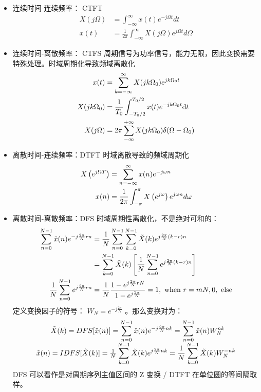 \documentclass[cn,11pt,chinese,black,simple]{elegantbook}
\begin{document}
\begin{itemize}
    \item 连续时间-连续频率： CTFT \[\begin{aligned}
        X(j \Omega) &=\int_{-\infty}^{\infty} x(t) e^{-j \Omega t} d t \\ 
        x(t) &=\frac{1}{2 \pi} \int_{-\infty}^{\infty} X(j \Omega) e^{j \Omega t} d \Omega
    \end{aligned}\]
    \item 连续时间-离散频率： CTFS 周期信号为功率信号，能力无限，因此变换需要特殊处理。时域周期化导致频域离散化 \[\begin{aligned}
        x(t) &= \displaystyle\sum_{k=-\infty}^{\infty} X(j k \Omega_0)     e^{jk\Omega_0 t} \\
        X(jk\Omega_0) &= \frac{1}{T_0} \int_{-T_0/2}^{T_0/2} x(t) e^{-jk\Omega_0 t} \mathrm{d}t \\ 
        X(j\Omega) &= 2\pi \sum_{-\infty}^{+\infty} X(jk\Omega_0) \delta (\Omega - \Omega_0) 
    \end{aligned}\]
    \item 离散时间-连续频率：DTFT 时域离散导致的频域周期化 \[
        \begin{aligned}
        X\left(e^{j \Omega T}\right)& =\displaystyle\sum_{n=-\infty}^{\infty} x(n) e^{-j \omega n} \\
        x(n) &=\frac{1}{2 \pi} \int_{-\pi}^{\pi} X\left(e^{j \omega}\right) e^{j \omega n} d \omega
        \end{aligned}
        \]
    \item 离散时间-离散频率：DFS 时域周期性离散化，不是绝对可和的： \[
        \begin{aligned}
        \displaystyle\sum_{n=0}^{N-1} \tilde{x}(n) e^{-j \frac{2 \pi}{N} r n} &=\frac{1}{N} \displaystyle\sum_{n=0}^{N-1} \displaystyle\sum_{k=0}^{N-1} \tilde{X}(k) e^{j \frac{2 \pi}{N}(k-r) n} \\
        &=\displaystyle\sum_{k=0}^{N-1} \tilde{X}(k)\left[\frac{1}{N} \displaystyle\sum_{n=0}^{N-1} e^{j \frac{2 \pi}{N}(k-r) n}\right] \\ 
        \frac{1}{N} \displaystyle\sum_{n=0}^{N-1} e^{j \frac{2 \pi}{N} r n} &=\frac{1}{N} \frac{1-e^{j \frac{2 \pi}{N} r N}}{1-e_{}^{j \frac{2 \pi}{N}}}= 1, \text{ when } r = mN , 0 , \text{ else} \\
        \end{aligned}\]
        定义变换因子的符号： \(W_N = e^{-j \frac{2\pi}{N}}\) 。那么变换对为：
        $$
        \begin{array}{l}
        \qquad \tilde{X}(k)=D F S[\tilde{x}(n)]=\displaystyle\sum_{n=0}^{N-1} \tilde{x}(n) e^{-j \frac{2 \pi}{N} n k}=\displaystyle\sum_{n=0}^{N-1} \tilde{x}(n) W_{N}^{n k} \\
        \tilde{x}(n)=I D F S[\tilde{X}(k)]=\frac{1}{N} \displaystyle\sum_{k=0}^{N-1} \tilde{X}(k) e^{j \frac{2 \pi}{N} n k}=\frac{1}{N} \displaystyle\sum_{k=0}^{N-1} \tilde{X}(k) W_{N}^{-n k}
        \end{array}
        $$
        DFS 可以看作是对周期序列主值区间的 Z 变换 / DTFT 在单位圆的等间隔取样。
\end{itemize}
\end{document}
